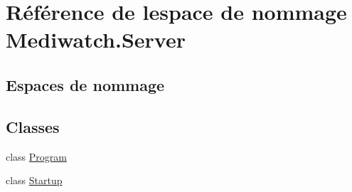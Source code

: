\hypertarget{namespace_mediwatch_1_1_server}{}\section{Référence de l\textquotesingle{}espace de nommage Mediwatch.\+Server}
\label{namespace_mediwatch_1_1_server}
\subsection*{Espaces de nommage}
\begin{DoxyCompactItemize}
\end{DoxyCompactItemize}
\subsection*{Classes}
\begin{DoxyCompactItemize}
\item 
class \hyperlink{class_mediwatch_1_1_server_1_1_program}{Program}
\item 
class \hyperlink{class_mediwatch_1_1_server_1_1_startup}{Startup}
\end{DoxyCompactItemize}
